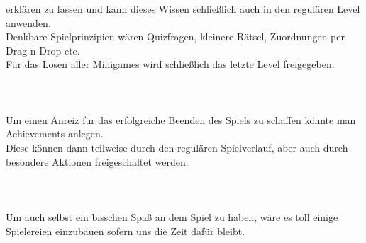 \documentclass[10pt,a4paper,notitlepage]{report}
\begin{document}
	erklären zu lassen und kann dieses Wissen schließlich auch in den regulären Level anwenden.\\
	Denkbare Spielprinzipien wären Quizfragen, kleinere Rätsel, Zuordnungen per Drag n Drop etc.\\
	Für das Lösen aller Minigames wird schließlich das letzte Level freigegeben.\\
	\\
	\
	\\\\
	\Text
		Um einen Anreiz für das erfolgreiche Beenden des Spiels zu schaffen könnte man Achievements anlegen.\\
	Diese können dann teilweise durch den regulären Spielverlauf, aber auch durch besondere Aktionen freigeschaltet werden.\\
	\\
	\\\\
	\Text
		Um auch selbst ein bisschen Spaß an dem Spiel zu haben, wäre es toll einige Spielereien einzubauen sofern uns die Zeit dafür bleibt.\\
	\\
	\Fusszeile
\end{document}
